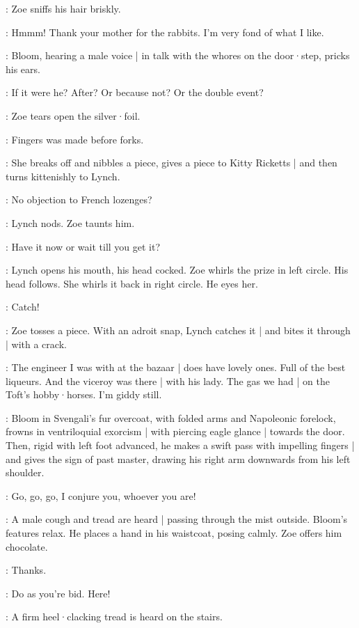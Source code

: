 :
Zoe sniffs his hair briskly.

\Zoe:
Hmmm!
Thank your mother for the rabbits.
I'm very fond of what I like.

:
Bloom,
hearing a male voice |
in talk with the whores on the door·step,
pricks his ears.

\Bloom:
If it were he?
After?
Or because not?
Or the double event?

:
Zoe tears open the silver·foil.

\Zoe:
Fingers was made before forks.

:
She breaks off and nibbles a piece,
gives a piece to Kitty Ricketts |
and then turns kittenishly to Lynch.

\Zoe:
No objection to French lozenges?

:
Lynch nods.
Zoe taunts him.

\Zoe:
Have it now or wait till you get it?

:
Lynch opens his mouth,
his head cocked.
Zoe whirls the prize in left circle.
His head follows.
She whirls it back in right circle.
He eyes her.

\Zoe:
Catch!

:
Zoe tosses a piece.
With an adroit snap,
Lynch catches it |
and bites it through |
with a crack.

\Kitty:
The engineer I was with at the bazaar |
does have lovely ones.
Full of the best liqueurs.
And the viceroy was there |
with his lady.
The gas we had |
on the Toft's hobby·horses.
I'm giddy still.

:
Bloom in Svengali's fur overcoat,
with folded arms and Napoleonic forelock,
frowns in ventriloquial exorcism |
with piercing eagle glance |
towards the door.
Then,
rigid with left foot advanced,
he makes a swift pass with impelling fingers |
and gives the sign of past master,
drawing his right arm downwards from his left shoulder.

\Bloom:
Go,
go,
go,
I conjure you,
whoever you are!

:
A male cough and tread are heard |
passing through the mist outside.
Bloom's features relax.
He places a hand in his waistcoat,
posing calmly.
Zoe offers him chocolate.

\Bloom:
Thanks.

\Zoe:
Do as you're bid.
Here!

:
A firm heel·clacking tread is heard on the stairs.

